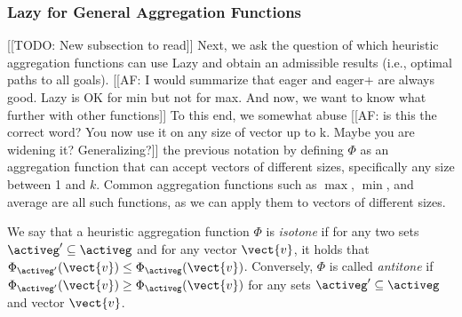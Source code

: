 

\subsubsection{Lazy for General Aggregation Functions}
[[TODO: New subsection to read]]
Next, we ask the question of which heuristic aggregation functions can use Lazy \kastar and obtain  an admissible results (i.e., optimal paths to all goals). [[AF: I would summarize that eager and eager+ are always good. Lazy is OK for min but not for max. And now, we want to know what further with other functions]]
To this end, we somewhat abuse [[AF: is this the correct word? You now use it on any size of vector up to k. Maybe you are widening it? Generalizing?]] the previous notation by defining $\Phi$ as an aggregation function that can accept vectors of different sizes,  specifically any size between 1 and $k$.
Common aggregation functions such as $\max$, $\min$, and average are all such functions, as we can apply them to vectors of different sizes. 

\begin{definition}
We say that a heuristic aggregation function $\Phi$ is \emph{isotone} if for any two sets $\activeg' \subseteq \activeg$ and for any vector $\vect{v}$, it holds that $\Phi_{\activeg'}(\vect{v})\leq \Phi_{\activeg}(\vect{v})$.
Conversely, $\Phi$ is called \emph{antitone} if $\Phi_{\activeg'}(\vect{v})\geq \Phi_{\activeg}(\vect{v})$ for any sets $\activeg'\subseteq \activeg$ and vector $\vect{v}$.
\end{definition}


